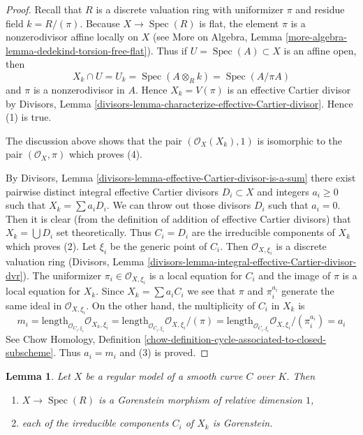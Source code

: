 \documentclass{stacks-project}
\theoremstyle{plain}
\newtheorem{lemma}[subsection]{Lemma}
\theoremstyle{definition}
\theoremstyle{remark}
\numberwithin{equation}{subsection}
\def\Spec{\mathop{\mathrm{Spec}}}
\begin{document}
\begin{proof}
Recall that $R$ is a discrete valuation ring with uniformizer $\pi$
and residue field $k = R/(\pi)$. Because $X \to \Spec(R)$ is flat,
the element $\pi$ is a nonzerodivisor affine locally on $X$
(see More on Algebra, Lemma
\ref{more-algebra-lemma-dedekind-torsion-free-flat}). Thus
if $U = \Spec(A) \subset X$ is an affine open, then
$$
X_k \cap U = U_k = \Spec(A \otimes_R k) = \Spec(A/\pi A)
$$
and $\pi$ is a nonzerodivisor in $A$.
Hence $X_k = V(\pi)$ is an effective Cartier divisor by
Divisors, Lemma \ref{divisors-lemma-characterize-effective-Cartier-divisor}.
Hence (1) is true.

\medskip\noindent
The discussion above shows that the pair $(\mathcal{O}_X(X_k), 1)$
is isomorphic to the pair $(\mathcal{O}_X, \pi)$ which proves (4).

\medskip\noindent
By Divisors, Lemma \ref{divisors-lemma-effective-Cartier-divisor-is-a-sum}
there exist pairwise distinct integral effective Cartier divisors
$D_i \subset X$ and integers $a_i \geq 0$ such that $X_k = \sum a_i D_i$.
We can throw out those divisors $D_i$ such that $a_i = 0$. Then it is
clear (from the definition of addition of effective Cartier
divisors) that $X_k = \bigcup D_i$ set theoretically. Thus $C_i = D_i$
are the irreducible components of $X_k$ which proves (2).
Let $\xi_i$ be the generic point of $C_i$.
Then $\mathcal{O}_{X, \xi_i}$ is a discrete valuation ring
(Divisors, Lemma \ref{divisors-lemma-integral-effective-Cartier-divisor-dvr}).
The uniformizer $\pi_i \in \mathcal{O}_{X, \xi_i}$ is a local equation
for $C_i$ and the image of $\pi$ is a local equation for $X_k$.
Since $X_k = \sum a_i C_i$ we see that $\pi$ and $\pi_i^{a_i}$
generate the same ideal in $\mathcal{O}_{X, \xi_i}$.
On the other hand, the multiplicity of $C_i$ in $X_k$ is
$$
m_i = \text{length}_{\mathcal{O}_{C_i, \xi_i}} \mathcal{O}_{X_k, \xi_i} =
\text{length}_{\mathcal{O}_{C_i, \xi_i}} \mathcal{O}_{X, \xi_i}/(\pi) =
\text{length}_{\mathcal{O}_{C_i, \xi_i}} \mathcal{O}_{X, \xi_i}/(\pi_i^{a_i}) =
a_i
$$
See Chow Homology, Definition
\ref{chow-definition-cycle-associated-to-closed-subscheme}.
Thus $a_i = m_i$ and (3) is proved.
\end{proof}

\begin{lemma}
\label{lemma-gorenstein}
Let $X$ be a regular model of a smooth curve $C$ over $K$. Then
\begin{enumerate}
\item $X \to \Spec(R)$ is a Gorenstein morphism of relative dimension $1$,
\item each of the irreducible components $C_i$ of $X_k$ is Gorenstein.
\end{enumerate}
\end{lemma}
\end{document}
